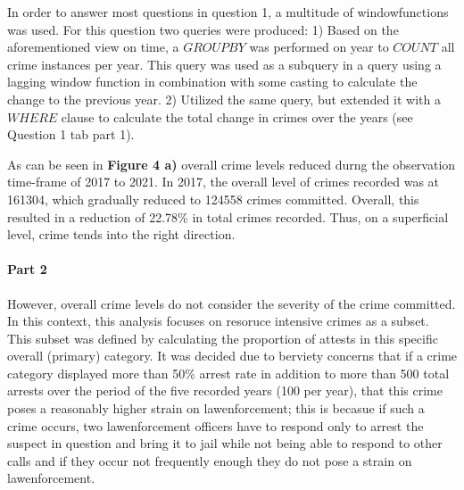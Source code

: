 \documentclass[a4paper]{article}
\begin{document}
In order to answer most questions in question 1, a multitude of windowfunctions was used. For this question two queries were produced: 1) Based on the aforementioned view on time, a $GROUP BY$ was performed on year to $COUNT$ all crime instances per year. This query was used as a subquery in a query using a lagging window function in combination with some casting to calculate the change to the previous year. 2) Utilized the same query, but extended it with a $WHERE$ clause to calculate the total change in crimes over the years (see Question 1 tab part 1).

As can be seen in \textbf{Figure 4 a)} overall crime levels reduced durng the observation time-frame of 2017 to 2021. In 2017, the overall level of crimes recorded was at 161304, which gradually reduced to 124558 crimes committed. Overall, this resulted in a reduction of 22.78\% in total crimes recorded. Thus, on a superficial level, crime tends into the right direction. 


\paragraph{Part 2} However, overall crime levels do not consider the severity of the crime committed. In this context, this analysis focuses on resoruce intensive crimes as a subset. This subset was defined by calculating the proportion of attests in this specific overall (primary) category. It was decided due to berviety concerns that if a crime category displayed more than 50\% arrest rate in addition to more than 500 total arrests over the period of the five recorded years (100 per year), that this crime poses a reasonably higher strain on lawenforcement; this is becasue if such a crime occurs, two lawenforcement officers have to respond only to arrest the suspect in question and bring it to jail while not being able to respond to other calls and if they occur not frequently enough they do not pose a strain on lawenforcement. 
\end{document}
